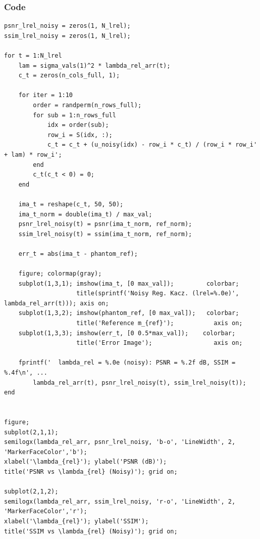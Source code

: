 \documentclass[12pt,a4paper]{article}
\begin{document}
\subsubsection*{Code}
\begin{lstlisting}
psnr_lrel_noisy = zeros(1, N_lrel);
ssim_lrel_noisy = zeros(1, N_lrel);

for t = 1:N_lrel
    lam = sigma_vals(1)^2 * lambda_rel_arr(t);
    c_t = zeros(n_cols_full, 1);

    for iter = 1:10
        order = randperm(n_rows_full);
        for sub = 1:n_rows_full
            idx = order(sub);
            row_i = S(idx, :);
            c_t = c_t + (u_noisy(idx) - row_i * c_t) / (row_i * row_i' + lam) * row_i';
        end
        c_t(c_t < 0) = 0;
    end

    ima_t = reshape(c_t, 50, 50);
    ima_t_norm = double(ima_t) / max_val;
    psnr_lrel_noisy(t) = psnr(ima_t_norm, ref_norm);
    ssim_lrel_noisy(t) = ssim(ima_t_norm, ref_norm);

    err_t = abs(ima_t - phantom_ref);

    figure; colormap(gray);
    subplot(1,3,1); imshow(ima_t, [0 max_val]);         colorbar;
                    title(sprintf('Noisy Reg. Kacz. (lrel=%.0e)', lambda_rel_arr(t))); axis on;
    subplot(1,3,2); imshow(phantom_ref, [0 max_val]);   colorbar;
                    title('Reference m_{ref}');           axis on;
    subplot(1,3,3); imshow(err_t, [0 0.5*max_val]);    colorbar;
                    title('Error Image');                 axis on;

    fprintf('  lambda_rel = %.0e (noisy): PSNR = %.2f dB, SSIM = %.4f\n', ...
        lambda_rel_arr(t), psnr_lrel_noisy(t), ssim_lrel_noisy(t));
end


figure;
subplot(2,1,1);
semilogx(lambda_rel_arr, psnr_lrel_noisy, 'b-o', 'LineWidth', 2, 'MarkerFaceColor','b');
xlabel('\lambda_{rel}'); ylabel('PSNR (dB)');
title('PSNR vs \lambda_{rel} (Noisy)'); grid on;

subplot(2,1,2);
semilogx(lambda_rel_arr, ssim_lrel_noisy, 'r-o', 'LineWidth', 2, 'MarkerFaceColor','r');
xlabel('\lambda_{rel}'); ylabel('SSIM');
title('SSIM vs \lambda_{rel} (Noisy)'); grid on;
\end{lstlisting}

\newpage
\end{document}
